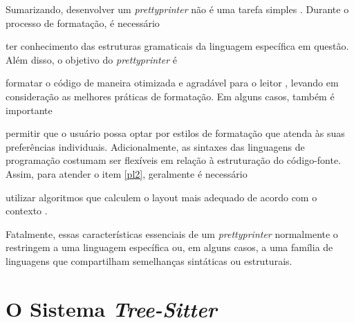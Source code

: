 \documentclass
  [11pt, a4paper, english, openright, sumario = tradicional, twoside, brazil]
  {abntex2}
\begin{document}
  Sumarizando, desenvolver um \textit{prettyprinter} não é uma tarefa simples
  \cite[55]{hughes-1995-design}. Durante o processo de formatação, é necessário
  \begin{inparaenum}
    \item ter conhecimento das estruturas gramaticais da linguagem específica
          em questão. Além disso, o objetivo do \textit{prettyprinter} é
    \item\label{pl2} formatar o código de maneira otimizada e agradável para o
          leitor \cite[55]{hughes-1995-design}, levando em consideração as
          melhores práticas de formatação. Em alguns casos, também é importante
    \item permitir que o usuário possa optar por estilos de formatação
          que atenda às suas preferências individuais. Adicionalmente, as
          sintaxes das linguagens de programação costumam ser flexíveis em
          relação à estruturação do código-fonte. Assim, para atender o item
          \ref{pl2}, geralmente é necessário
    \item utilizar algoritmos que calculem o layout mais adequado de acordo
          com o contexto
          \cites
            [12]{jasper-2023-clang}
            {goldstein-1973-pretty}
            {hughes-1995-design}
            {yelland-2015-new}.
  \end{inparaenum}
  Fatalmente, essas características essenciais de um \textit{prettyprinter}
  normalmente o restringem a uma linguagem específica ou, em alguns casos, a
  uma família de linguagens que compartilham semelhanças sintáticas ou
  estruturais.


  \chapter{O Sistema \textit{Tree-Sitter}}
\end{document}
